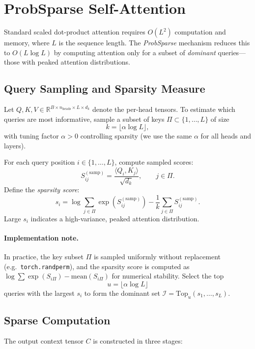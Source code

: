 \documentclass[11pt]{article}
\begin{document}
\section{ProbSparse Self-Attention}\label{sec:probsparse}

Standard scaled dot-product attention requires $O(L^2)$ computation and memory,
where $L$ is the sequence length.
The \emph{ProbSparse} mechanism reduces this to $O(L\log L)$
by computing attention only for a subset of \emph{dominant} queries—those with peaked attention distributions.

\subsection{Query Sampling and Sparsity Measure}

Let $Q, K, V \in \mathbb{R}^{B \times n_{\text{heads}} \times L \times d_k}$ denote the per-head tensors.
To estimate which queries are most informative, sample a subset of keys
$\Pi \subset \{1, \ldots, L\}$ of size
\[
k = \lfloor \alpha \log L \rfloor,
\]
with tuning factor $\alpha>0$ controlling sparsity (we use the same $\alpha$ for all heads and layers).

For each query position $i\in\{1,\dots,L\}$, compute sampled scores:
\[
S_{ij}^{(\text{samp})}
= \frac{\langle Q_i, K_j \rangle}{\sqrt{d_k}},
\qquad j \in \Pi.
\]
Define the \emph{sparsity score}:
\[
s_i =
\log \sum_{j \in \Pi} \exp(S_{ij}^{(\text{samp})})
- \frac{1}{k} \sum_{j \in \Pi} S_{ij}^{(\text{samp})}.
\]
Large $s_i$ indicates a high-variance, peaked attention distribution.

\paragraph{Implementation note.}
In practice, the key subset $\Pi$ is sampled uniformly without replacement (e.g.\ \texttt{torch.randperm}),
and the sparsity score is computed as $\log\!\sum\exp(S_{i\Pi}) - \mathrm{mean}(S_{i\Pi})$ for numerical stability.
Select the top
\[
u = \lfloor \alpha \log L \rfloor
\]
queries with the largest $s_i$ to form the dominant set
$\mathcal{I} = \mathrm{Top}_u(s_1, \dots, s_L)$.

\subsection{Sparse Computation}

The output context tensor $C$ is constructed in three stages:
\end{document}
